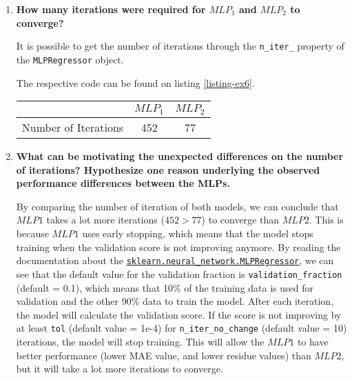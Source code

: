 \documentclass[12pt]{article}
\begin{document}
\begin{enumerate}[leftmargin=\labelsep,resume]
    \item {\color{questioncolor}\bfseries
          How many iterations were required for $MLP_1$ and $MLP_2$ to converge?
          }\\
          \vspace{0.5em}

          It is possible to get the number of iterations through the
          \texttt{n\_iter\_} property of the \texttt{MLPRegressor} object.

          The respective code can be found on listing \ref{listing-ex6}.

          \begin{center}
              \captionsetup{type=table}
              \begin{tabular}{c|c|c}
                                       & $MLP_1$ & $MLP_2$ \\
                  \hline
                  Number of Iterations & 452     & 77
              \end{tabular}
          \end{center}

    \item {\color{questioncolor}\bfseries
          What can be motivating the unexpected differences on the number of iterations?
          Hypothesize one reason underlying the observed performance differences between the MLPs.
          }\\
          \vspace{0.5em}

          By comparing the number of iteration of both models, we can conclude that
          $MLP1$ takes a lot more iterations ($452 > 77$) to converge than $MLP2$.
          This is because $MLP1$ uses early stopping, which means that the model
          stops training when the validation score is not improving anymore.
          By reading the documentation about the
          \href{https://scikit-learn.org/stable/modules/generated/sklearn.neural_network.MLPRegressor.html}{\texttt{sklearn.neural\_network.MLPRegressor}},
          we can see that the default value for the validation fraction is
          \texttt{validation\_fraction} (default = 0.1), which means that 10\%
          of the training data is used for validation and the other 90\% data
          to train the model.
          After each iteration, the model will calculate the validation score.
          If the score is not improving by at least \texttt{tol} (default value = 1e-4)
          for \texttt{n\_iter\_no\_change} (default value = 10) iterations,
          the model will stop training.
          This will allow the $MLP1$ to have better performance
          (lower MAE value, and lower residue values) than $MLP2$, but it will take a
          lot more iterations to converge.


\end{enumerate}
\end{document}
